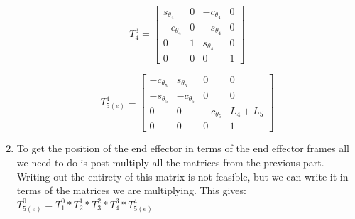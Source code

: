 \documentclass[12pt]{article}
\begin{document}
\begin{enumerate}
\begin{equation}	
	T^{3}_{4} = \begin{bmatrix}
	s_{\theta_{4}} & 0  & -c_{\theta_{4}}  &0\\
	-c_{\theta_{4}}  & 0  & -s_{\theta_{4}} & 0\\
	0 & 1 & s_{\theta_{4}}  & 0\\
	0 & 0 & 0 & 1
	\end{bmatrix}
\end{equation}

\begin{equation}	
	T^{4}_{5(e)} = \begin{bmatrix}
	-c_{\theta_{5}} & s_{\theta_{5}}   & 0  &0\\
	-s_{\theta_{5}} & -c_{\theta_{5}}  & 0 & 0\\
	0 & 0 & -c_{\theta_{5}} & L_{4}+L_{5}\\
	0 & 0 & 0 & 1
	\end{bmatrix}
\end{equation}

\item 

To get the position of the end effector in terms of the end effector frames all we need to do is post multiply all the matrices from the previous part. Writing out the entirety of this matrix is not feasible, but we can write it in terms of the matrices we are multiplying. This gives:
$T^{0}_{5(e)} =T^{0}_{1}*T^{1}_{2}*T^{2}_{3}*T^{3}_{4}*T^{4}_{5(e)}$
\end{enumerate}
 


\newpage
\end{document}
